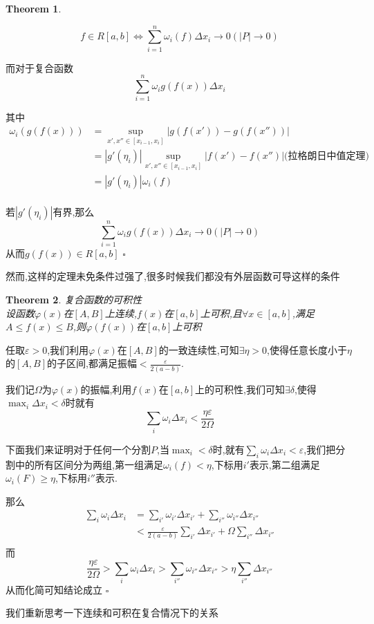 \documentclass[11pt,hyperref,a4paper,UTF8]{ctexart}
\newtheorem{theorem}{Theorem}[subsection]
\newenvironment{cproof}{%
\heiti{证明}\kaishu
}{%
  \hfill $\square$
  \par\bigskip
}
\newcommand{\parameter}[1]{\left(#1\right)}
\newcommand{\abs}[1]{\left|#1\right|}
\begin{document}
\begin{CJK}{UTF8}{gkai}
\begin{theorem}
\end{theorem}

\begin{cproof}
\[f\in R[a,b] \Leftrightarrow \sum_{i =1}^{n} \omega_i(f) \Delta x_i \to 0 (|P| \to 0)\]

而对于复合函数
\[\sum_{i =1}^{n} \omega_i g(f(x)) \Delta x_i \]

其中
\[
\begin{aligned}  
  \omega_i(g(f(x))) &= \sup_{x',x''\in[x_{i - 1},x_i]} \abs{g\parameter{f(x')} - g\parameter{f(x'')}}\\
  &= |g'(\eta_i)| \sup_{x',x''\in[x_{i - 1},x_i]} \abs{f(x') - f(x'')}\text{(拉格朗日中值定理)}\\
  &= |g'(\eta_i)| \omega_i(f)\\
\end{aligned}  
  \]

若$|g'(\eta_i)|$有界,那么 \[\sum_{i =1}^{n} \omega_i g(f(x)) \Delta x_i  \to 0(|P| \to 0)\]
从而$g(f(x))\in R[a,b]$
\end{cproof}
然而,这样的定理未免条件过强了,很多时候我们都没有外层函数可导这样的条件

\begin{theorem}
  复合函数的可积性\\

  设函数$\varphi(x)$在$[A,B]$上连续,$f(x)$在$[a,b]$上可积,且$\forall x \in [a,b]$,满足$A \leq f(x) \leq B$,则$\varphi(f(x))$在$[a,b]$上可积
\end{theorem}

\begin{cproof}
  任取$\varepsilon > 0$,我们利用$\varphi(x)$在$[A,B]$的一致连续性,可知$\exists \eta > 0$,使得任意长度小于$\eta$的$[A,B]$的子区间,都满足振幅$< \frac{\varepsilon}{2(a - b)}$.

  我们记$\Omega$为$\varphi(x)$的振幅,利用$f(x)$在$[a,b]$上的可积性,我们可知$\exists \delta$,使得$\max_i \Delta x_i < \delta$时就有
  \[\sum_{i} \omega_i \Delta x_i < \frac{\eta \varepsilon}{2 \Omega}\]

  下面我们来证明对于任何一个分割$P$,当$\max_i < \delta$时,就有$\sum_i \omega_i \Delta x_i < \varepsilon$,我们把分割中的所有区间分为两组,第一组满足$\omega_i(f) < \eta$,下标用$i'$表示,第二组满足$\omega_i(F) \geq \eta$,下标用$i''$表示.

  那么
  \[\begin{aligned}
    \sum_{i} \omega_i \Delta x_i &= \sum_{i'} \omega_{i'} \Delta x_{i'} + \sum_{i''} \omega_{i''} \Delta x_{i''}\\
    &< \frac{\varepsilon}{2(a - b)} \sum_{i'} \Delta x_{i'} + \Omega \sum_{i''} \Delta x_{i''}\\
  \end{aligned}\]
  而
  \[\frac{ \eta \varepsilon}{2 \Omega} > \sum_{i} \omega_i \Delta x_i > \sum_{i''} \omega_{i''} \Delta x_{i''} > \eta \sum_{i''} \Delta x_{i''}\]
  从而化简可知结论成立
\end{cproof}
我们重新思考一下连续和可积在复合情况下的关系


\end{CJK}
\end{document}
